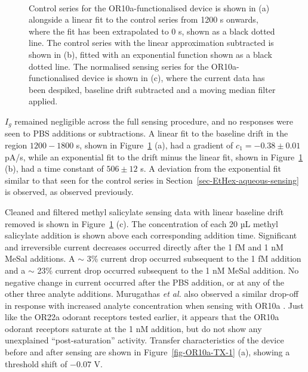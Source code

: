 \documentclass[
  a4paper,
]{scrbook}
\begin{document}
\begin{figure}
\begin{minipage}[t]{0.70\linewidth}
{{}

}

\end{minipage}%
%
\begin{minipage}[t]{0.15\linewidth}

{\centering 

~

}

\end{minipage}%

\caption[Control series for the OR10a-functionalised device alongside a
linear fitted curve, the control series with linear fit subtracted and
fitted with an exponential curve, and the normalised and filtered
sensing series for the OR10a-functionalised
device.]{\label{fig-OR10a-sensing}Control series for the
OR10a-functionalised device is shown in (a) alongside a linear fit to
the control series from 1200 s onwards, where the fit has been
extrapolated to 0 s, shown as a black dotted line. The control series
with the linear approximation subtracted is shown in (b), fitted with an
exponential function shown as a black dotted line. The normalised
sensing series for the OR10a-functionalised device is shown in (c),
where the current data has been despiked, baseline drift subtracted and
a moving median filter applied.}

\end{figure}

\(I_g\) remained negligible across the full sensing procedure, and no
responses were seen to PBS additions or subtractions. A linear fit to
the baseline drift in the region \(1200-1800\) s, shown in
Figure~\ref{fig-OR10a-sensing} (a), had a gradient of
\(c_1 = -0.38 \pm 0.01\) pA/s, while an exponential fit to the drift
minus the linear fit, shown in Figure~\ref{fig-OR10a-sensing} (b), had a
time constant of \(506 \pm 12\) s. A deviation from the exponential fit
similar to that seen for the control series in
Section~\ref{sec-EtHex-aqueous-sensing} is observed, as observed
previously.

Cleaned and filtered methyl salicylate sensing data with linear baseline
drift removed is shown in Figure~\ref{fig-OR10a-sensing} (c). The
concentration of each 20 µL methyl salicylate addition is shown above
each corresponding addition time. Significant and irreversible current
decreases occurred directly after the 1 fM and 1 nM MeSal additions. A
\(\sim\) 3\% current drop occurred subsequent to the 1 fM addition and a
\(\sim\) 23\% current drop occurred subsequent to the 1 nM MeSal
addition. No negative change in current occurred after the PBS addition,
or at any of the other three analyte additions. Murugathas \emph{et al.}
also observed a similar drop-off in response with increased analyte
concentration when sensing with OR10a \autocite{Murugathas2019a}. Just
like the OR22a odorant receptors tested earlier, it appears that the
OR10a odorant receptors saturate at the 1 nM addition, but do not show
any unexplained ``post-saturation'' activity. Transfer characteristics
of the device before and after sensing are shown in
Figure~\ref{fig-OR10a-TX-1} (a), showing a threshold shift of \(-0.07\)
V.
\end{document}
